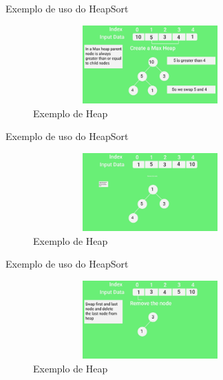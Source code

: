 \begin{frame}
	\begin{block}{Exemplo de uso do HeapSort}
		\begin{figure}[!htb]
			\centering	  				
			\includegraphics[height=3cm, width = 9cm]{./pic/scene01297.jpg}
			\caption{Exemplo de Heap}
		\end{figure}
	\end{block}
\end{frame}

\begin{frame}
	\begin{block}{Exemplo de uso do HeapSort}
		\begin{figure}[!htb]
			\centering	  				
			\includegraphics[height=3cm, width = 9cm]{./pic/scene01513.jpg}
			\caption{Exemplo de Heap}
		\end{figure}
	\end{block}
\end{frame}

\begin{frame}
	\begin{block}{Exemplo de uso do HeapSort}
		\begin{figure}[!htb]
			\centering	  				
			\includegraphics[height=3cm, width = 9cm]{./pic/scene02449.jpg}
			\caption{Exemplo de Heap}
		\end{figure}
	\end{block}
\end{frame}


